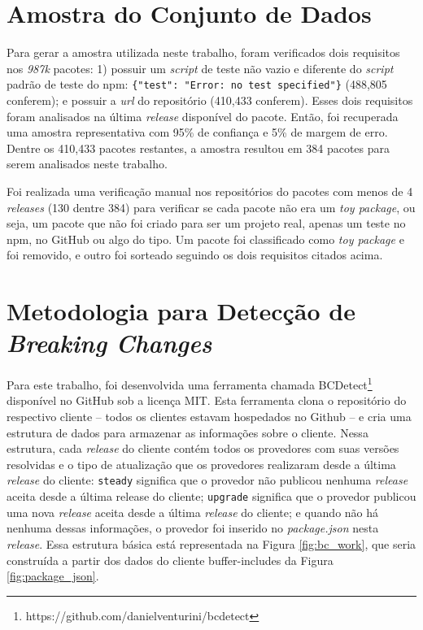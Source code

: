 \section{Amostra do Conjunto de Dados}
\label{sec:col_amostra}
Para gerar a amostra utilizada neste trabalho, foram verificados dois requisitos nos \textit{987k} pacotes: 1) possuir um \textit{script} de teste não vazio e diferente do \textit{script} padrão de teste do \textsf{npm}: \texttt{\{"test": "Error: no test specified"\}} (488,805 conferem); e possuir a \textit{url} do repositório (410,433 conferem). Esses dois requisitos foram analisados na última \textit{release} disponível do pacote. Então, foi recuperada uma amostra representativa com 95\% de confiança e 5\% de margem de erro. Dentre os 410,433 pacotes restantes, a amostra resultou em 384 pacotes para serem analisados neste trabalho.

Foi realizada uma verificação manual nos repositórios do pacotes com menos de 4 \textit{releases} (130 dentre 384) para verificar se cada pacote não era um \textit{toy package}, ou seja, um pacote que não foi criado para ser um projeto real, apenas um teste no \textsf{npm}, no \textsf{GitHub} ou algo do tipo. Um pacote foi classificado como \textit{toy package} e foi removido, e outro foi sorteado seguindo os dois requisitos citados acima.

\section{Metodologia para Detecção de \textit{Breaking Changes}}
\label{sec:bcdetect}
Para este trabalho, foi desenvolvida uma ferramenta chamada \textsf{BCDetect}\footnote{https://github.com/danielventurini/bcdetect} disponível no \textsf{GitHub} sob a licença \textsf{MIT}. Esta ferramenta clona o repositório do respectivo cliente -- todos os clientes estavam hospedados no \textsf{Github} -- e cria uma estrutura de dados para armazenar as informações sobre o cliente. Nessa estrutura, cada \textit{release} do cliente contém todos os provedores com suas versões resolvidas e o tipo de atualização que os provedores realizaram desde a última \textit{release} do cliente: \texttt{steady} significa que o provedor não publicou nenhuma \textit{release} aceita desde a última release do cliente; \texttt{upgrade} significa que o provedor publicou uma nova \textit{release} aceita desde a última \textit{release} do cliente; e quando não há nenhuma dessas informações, o provedor foi inserido no \textit{package.json} nesta \textit{release}. Essa estrutura básica está representada na Figura \ref{fig:bc_work}, que seria construída a partir dos dados do cliente \textsf{buffer-includes} da Figura \ref{fig:package_json}.

